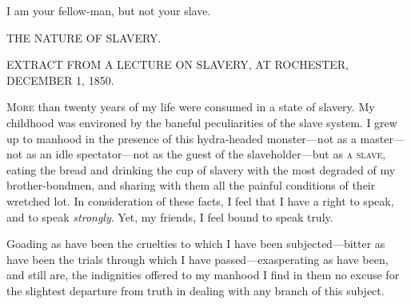 I am your fellow-man, but not your slave.

{\protect\hypertarget{ux5cux7bux5cux7bux5cux7b1ux5cux7dux5cux7dux5cux7d}{}{}}

{\protect\hypertarget{429}{}{}}

{THE NATURE OF SLAVERY.}

{EXTRACT FROM A LECTURE ON SLAVERY, AT ROCHESTER, DECEMBER 1, 1850.}

\textsc{More} than twenty years of my life were consumed in a state of
slavery. My childhood was environed by the baneful peculiarities of the
slave system. I grew up to manhood in the presence of this hydra-headed
monster---not as a master---not as an idle spectator---not as the guest
of the slaveholder---but as \textsc{a slave}, eating the bread and
drinking the cup of slavery with the most degraded of my
brother-bondmen, and sharing with them all the painful conditions of
their wretched lot. In consideration of these facts, I feel that I have
a right to speak, and to speak \emph{strongly}. Yet, my friends, I feel
bound to speak truly.

Goading as have been the cruelties to which I have been
subjected---bitter as have been the trials through which I have
passed---exasperating as have been, and still are, the indignities
offered to my manhood I find in them no excuse for the slightest
departure from truth in dealing with any branch of this subject.

